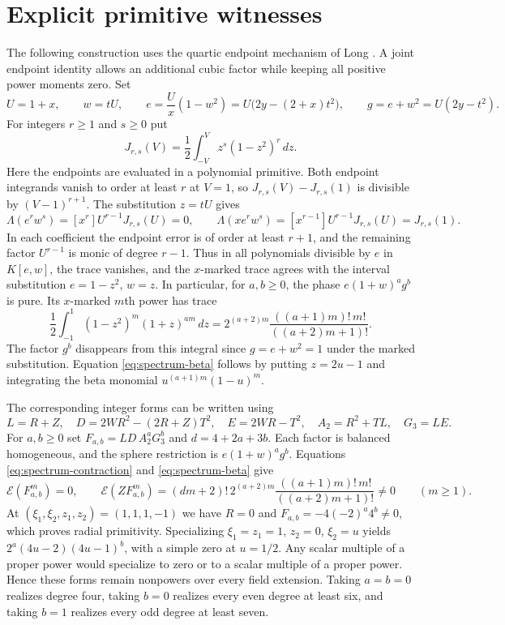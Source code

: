 \section{Explicit primitive witnesses}\label{sec:witnesses}

The following construction uses the quartic endpoint mechanism of
Long \cite[Theorem~3.1]{longcompact}. A joint endpoint identity allows
an additional cubic factor while keeping all positive power moments
zero. Set
\[
 U=1+x,\qquad w=tU,\qquad
 e=\frac{U}{x}(1-w^2)=U\bigl(2y-(2+x)t^2\bigr),\qquad
 g=e+w^2=U(2y-t^2).
\]
For integers \(r\ge1\) and \(s\ge0\) put
\[
 J_{r,s}(V)=\frac12\int_{-V}^V z^s(1-z^2)^r\,dz.
\]
Here the endpoints are evaluated in a polynomial primitive.
Both endpoint integrands vanish to order at least \(r\) at \(V=1\),
so \(J_{r,s}(V)-J_{r,s}(1)\) is divisible by \((V-1)^{r+1}\).
The substitution \(z=tU\) gives
\[
 \Lambda(e^r w^s)=[x^r]U^{r-1}J_{r,s}(U)=0,\qquad
 \Lambda(xe^r w^s)=[x^{r-1}]U^{r-1}J_{r,s}(U)=J_{r,s}(1).
\]
In each coefficient the endpoint error is of order at least \(r+1\),
and the remaining factor \(U^{r-1}\) is monic of degree \(r-1\).
Thus in all polynomials divisible by \(e\) in \(K[e,w]\), the trace
vanishes, and the \(x\)-marked trace agrees with the interval
substitution \(e=1-z^2\), \(w=z\). In particular, for \(a,b\ge0\),
the phase \(e(1+w)^a g^b\) is pure. Its \(x\)-marked \(m\)th power
has trace
\begin{equation}\label{eq:spectrum-beta}
 \frac12\int_{-1}^1(1-z^2)^m(1+z)^{am}\,dz
 =2^{(a+2)m}\frac{((a+1)m)!\,m!}{((a+2)m+1)!}.
\end{equation}
The factor \(g^b\) disappears from this integral since \(g=e+w^2=1\)
under the marked substitution. Equation \eqref{eq:spectrum-beta}
follows by putting \(z=2u-1\) and integrating the beta monomial
\(u^{(a+1)m}(1-u)^m\).

The corresponding integer forms can be written using
\[
 L=R+Z,\quad D=2WR^2-(2R+Z)T^2,\quad E=2WR-T^2,\quad
 A_2=R^2+TL,\quad G_3=LE.
\]
For \(a,b\ge0\) set \(F_{a,b}=LD\,A_2^aG_3^b\) and \(d=4+2a+3b\).
Each factor is balanced homogeneous, and the sphere restriction is
\(e(1+w)^a g^b\). Equations \eqref{eq:spectrum-contraction} and
\eqref{eq:spectrum-beta} give
\[
 \mathcal E(F_{a,b}^m)=0,\qquad
 \mathcal E(ZF_{a,b}^m)=(dm+2)!\,2^{(a+2)m}
             \frac{((a+1)m)!\,m!}{((a+2)m+1)!}\ne0
 \qquad(m\ge1).
\]
At \((\xi_1,\xi_2,z_1,z_2)=(1,1,1,-1)\) we have \(R=0\) and
\(F_{a,b}=-4(-2)^a4^b\ne0\), which proves radial primitivity.
Specializing \(\xi_1=z_1=1\), \(z_2=0\), \(\xi_2=u\) yields
\(2^a(4u-2)(4u-1)^b\), with a simple zero at \(u=1/2\). Any scalar
multiple of a proper power would specialize to zero or to a scalar
multiple of a proper power. Hence these forms remain nonpowers over
every field extension. Taking \(a=b=0\) realizes degree four,
taking \(b=0\) realizes every even degree at least six, and taking
\(b=1\) realizes every odd degree at least seven.
